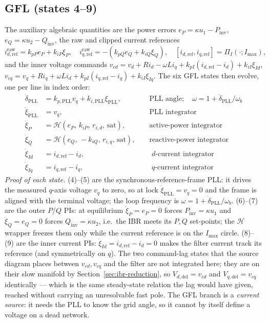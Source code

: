 \documentclass[12pt,a4paper]{article}
\theoremstyle{remark}
\begin{document}
\subsection{GFL (states 4--9)}
The auxiliary algebraic quantities are the power errors
$e_P=\kappa u_1-P_{\mathrm{inv}}$, $e_Q=\kappa u_2-Q_{\mathrm{inv}}$, the raw and
clipped current references
\begin{equation}
  i_{d,\mathrm{ref}}^{\mathrm{raw}}=k_{pP}e_P+k_{iP}\xi_P,\quad
  i_{q,\mathrm{ref}}^{\mathrm{raw}}=-(k_{pQ}e_Q+k_{iQ}\xi_Q),\quad
  [i_{d,\mathrm{ref}},i_{q,\mathrm{ref}}]=\Pi_I(\cdot;I_{\max}),
\end{equation}
and the inner voltage commands
$v_{cd}=v_d+R i_d-\omega L i_q+k_{pI}(i_{d,\mathrm{ref}}-i_d)+k_{iI}\xi_{Id}$,
$v_{cq}=v_q+R i_q+\omega L i_d+k_{pI}(i_{q,\mathrm{ref}}-i_q)+k_{iI}\xi_{Iq}$.
The six GFL states then evolve, one per line in index order:
\begin{align}
  \dot{\delta}_{\mathrm{PLL}} &= k_{p,\mathrm{PLL}}v_q+k_{i,\mathrm{PLL}}\xi_{\mathrm{PLL}},
     &&\text{ PLL angle};\quad \omega=1+\dot\delta_{\mathrm{PLL}}/\omega_b\\
  \dot{\xi}_{\mathrm{PLL}} &= v_q, &&\text{ PLL integrator}\\
  \dot{\xi}_P &= \mathcal{H}(e_P,\,k_{iP},\,r_{i,d},\,\text{sat}),
     &&\text{ active-power integrator}\\
  \dot{\xi}_Q &= \mathcal{H}(e_Q,\,-k_{iQ},\,r_{i,q},\,\text{sat}),
     &&\text{ reactive-power integrator}\\
  \dot{\xi}_{Id} &= i_{d,\mathrm{ref}}-i_d, &&\text{ $d$-current integrator}\\
  \dot{\xi}_{Iq} &= i_{q,\mathrm{ref}}-i_q, &&\text{ $q$-current integrator}
\end{align}
\emph{Proof of each state.} (4)--(5) are the synchronous-reference-frame PLL: it
drives the measured $q$-axis voltage $v_q$ to zero, so at lock $\dot\xi_{\mathrm{PLL}}
=v_q=0$ and the frame is aligned with the terminal voltage; the loop frequency is
$\omega=1+\dot\delta_{\mathrm{PLL}}/\omega_b$. (6)--(7) are the outer $P$/$Q$ PIs:
at equilibrium $\dot\xi_P=e_P=0$ forces $P_{\mathrm{inv}}=\kappa u_1$ and
$\dot\xi_Q=e_Q=0$ forces $Q_{\mathrm{inv}}=\kappa u_2$, i.e.\ the IBR meets its
$P,Q$ set-points; the $\mathcal H$ wrapper freezes them only while the current
reference is on the $I_{\max}$ circle. (8)--(9) are the inner current PIs:
$\dot\xi_{Id}=i_{d,\mathrm{ref}}-i_d=0$ makes the filter current track its
reference (and symmetrically on $q$). The two command-lag states that the source
diagram places between $v_{cd},v_{cq}$ and the filter are not integrated here;
they are on their slow manifold by Section~\ref{sec:ibr-reduction}, so
$V_{d,\mathrm{del}}=v_{cd}$ and $V_{q,\mathrm{del}}=v_{cq}$ identically --- which
is the same steady-state relation the lag would have given, reached without
carrying an unresolvable fast pole. The GFL branch is a \emph{current source}: it
needs the PLL to know the grid angle, so it cannot by itself define a voltage on a
dead network.
\end{document}
